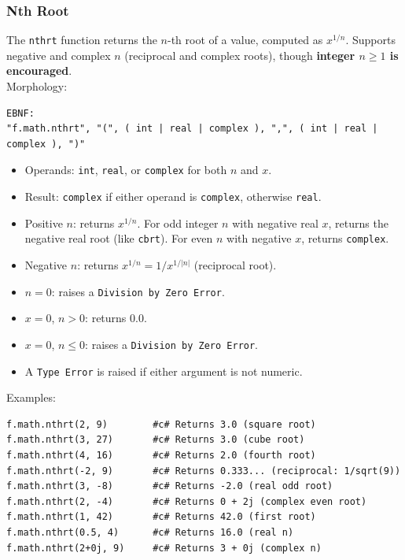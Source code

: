 \subsubsection{Nth Root}
The \texttt{nthrt} function returns the $n$-th root of a value, computed as $x^{1/n}$. Supports negative and complex $n$ (reciprocal and complex roots), though \textbf{integer $n \geq 1$ is encouraged}.\\
Morphology:
\begin{verbatim}
EBNF:
"f.math.nthrt", "(", ( int | real | complex ), ",", ( int | real | complex ), ")"
\end{verbatim}
\begin{itemize}
\item Operands: \texttt{int}, \texttt{real}, or \texttt{complex} for both $n$ and $x$.
\item Result: \texttt{complex} if either operand is \texttt{complex}, otherwise \texttt{real}.
\item Positive $n$: returns $x^{1/n}$. For odd integer $n$ with negative real $x$, returns the negative real root (like \texttt{cbrt}). For even $n$ with negative $x$, returns \texttt{complex}.
\item Negative $n$: returns $x^{1/n} = 1 / x^{1/|n|}$ (reciprocal root).
\item $n = 0$: raises a \texttt{Division by Zero Error}.
\item $x = 0$, $n > 0$: returns $0.0$.
\item $x = 0$, $n \leq 0$: raises a \texttt{Division by Zero Error}.
\item A \texttt{Type Error} is raised if either argument is not numeric.
\end{itemize}
Examples:
\begin{verbatim}
f.math.nthrt(2, 9)        #c# Returns 3.0 (square root)
f.math.nthrt(3, 27)       #c# Returns 3.0 (cube root)
f.math.nthrt(4, 16)       #c# Returns 2.0 (fourth root)
f.math.nthrt(-2, 9)       #c# Returns 0.333... (reciprocal: 1/sqrt(9))
f.math.nthrt(3, -8)       #c# Returns -2.0 (real odd root)
f.math.nthrt(2, -4)       #c# Returns 0 + 2j (complex even root)
f.math.nthrt(1, 42)       #c# Returns 42.0 (first root)
f.math.nthrt(0.5, 4)      #c# Returns 16.0 (real n)
f.math.nthrt(2+0j, 9)     #c# Returns 3 + 0j (complex n)
\end{verbatim}

